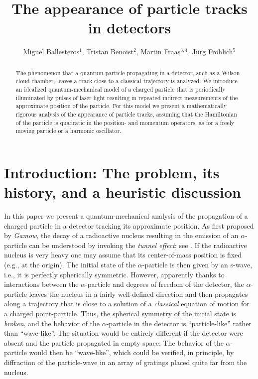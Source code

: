 \documentclass[11pt]{article}
\author{Miguel Ballesteros$^1$, Tristan Benoist$^2$, Martin Fraas$^{3,4}$, J\"urg Fr\"ohlich$^5$}
\title{The appearance of particle tracks in detectors}
\begin{document}
\maketitle


\vspace{1em}

\begin{abstract}
The phenomenon that a quantum particle propagating in a detector, such as a 
Wilson cloud chamber, leaves a track close to a classical trajectory is analyzed. We introduce an idealized quantum-mechanical model of a charged particle that is periodically illuminated by pulses of laser light resulting in repeated indirect
measurements of the approximate position of the particle. For this model we present a mathematically rigorous analysis 
of the appearance of particle tracks, assuming that the Hamiltonian of the particle is quadratic in the position- and 
momentum operators, as for a freely moving particle or a harmonic oscillator.
\end{abstract}

\section{Introduction: The problem, its history, and a heuristic discussion}\label{Intro}
In this paper we present a quantum-mechanical analysis of the propagation of a charged particle in a detector tracking its approximate position. As first proposed by \textit{Gamow}, the decay of a radioactive nucleus resulting in the emission of an 
$\alpha$-particle can be understood by invoking the \textit{tunnel effect}; see \cite{Gamow}. If the radioactive nucleus 
is very heavy one may assume that its center-of-mass position is fixed (e.g., at the origin). The initial state of the 
$\alpha$-particle is then given by an s-wave, i.e., it is perfectly spherically symmetric. However, apparently 
thanks to interactions between the $\alpha$-particle and degrees of freedom of the detector, the $\alpha$-particle 
leaves the nucleus in a fairly well-defined direction and then propagates along a trajectory 
that is close to a solution of a \textit{classical} equation of motion for a charged point-particle. 
Thus, the spherical symmetry of the initial state is \textit{broken}, and the behavior of the $\alpha$-particle in the detector is ``particle-like'' rather than ``wave-like''. The situation would be entirely different if the detector were absent and the particle propagated in empty space: The behavior of the $\alpha$-particle would then be ``wave-like'', which could be verified, in principle, by diffraction of the 
particle-wave in an array of gratings placed quite far from the nucleus.
\end{document}
